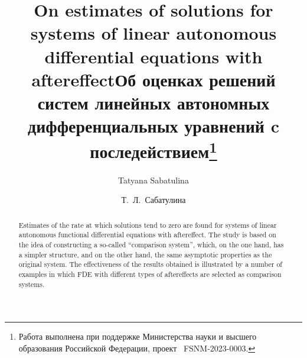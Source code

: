 \begin{englishtitle} %
\title{On estimates of solutions for systems of linear autonomous differential equations with aftereffect}
\author{Tatyana Sabatulina
}

\maketitle

\begin{abstract}
Estimates of the rate at which solutions tend to zero are found for systems of linear autonomous functional differential equations with aftereffect. The study is based on the idea of constructing a so-called ``comparison system'', which, on the one hand, has a simpler structure, and on the other hand, the same asymptotic properties as the original system. The effectiveness of the results obtained is illustrated by a number of examples in which FDE with different types of aftereffects are selected as comparison systems.

\end{abstract}
\end{englishtitle}

\iffalse
\documentclass[12pt]{llncs}


\usepackage{iftex}

\ifPDFTeX
\usepackage[T2A]{fontenc}
\usepackage[utf8]{inputenc} %
\usepackage[english,russian]{babel}
\fi

\usepackage{todonotes}

\usepackage[russian]{nla}


\fi
%

\title{Об оценках решений систем линейных автономных дифференциальных уравнений c последействием\thanks{Работа выполнена при поддержке Министерства науки и высшего образования Российской Федерации, проект \textnumero~FSNM-2023-0003.}}
\author{Т.~Л.~Сабатулина  %
} %

